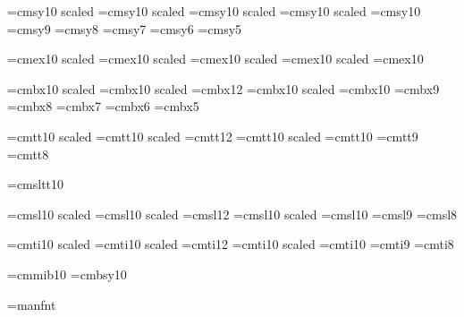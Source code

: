 \font\eighteensy=cmsy10 scaled		%
\font\fourteensy=cmsy10 scaled		%
\font\twelvesy=cmsy10 scaled		%
\font\elevensy=cmsy10 scaled\magstephalf	%
\font\tensy=cmsy10
\font\ninesy=cmsy9
\font\eightsy=cmsy8
\font\sevensy=cmsy7
\font\sixsy=cmsy6
\font\fivesy=cmsy5

\font\eighteenex=cmex10 scaled		%
\font\fourteenex=cmex10 scaled		%
\font\twelveex=cmex10 scaled		%
\font\elevenex=cmex10 scaled\magstephalf	%
\font\tenex=cmex10


\font\eighteenbf=cmbx10 scaled		%
\font\fourteenbf=cmbx10 scaled		%
\font\twelvebf=cmbx12				%
\font\elevenbf=cmbx10 scaled\magstephalf	%
\font\tenbf=cmbx10
\font\ninebf=cmbx9
\font\eightbf=cmbx8
\font\sevenbf=cmbx7
\font\sixbf=cmbx6
\font\fivebf=cmbx5

\font\eighteentt=cmtt10 scaled		%
\font\fourteentt=cmtt10 scaled		%
\font\twelvett=cmtt12				%
\font\eleventt=cmtt10 scaled \magstephalf	%
\font\tentt=cmtt10
\font\ninett=cmtt9
\font\eighttt=cmtt8

\font\preloaded=cmsltt10 %

\font\eighteensl=cmsl10 scaled		%
\font\fourteensl=cmsl10 scaled		%
\font\twelvesl=cmsl12				%
\font\elevensl=cmsl10 scaled \magstephalf	%
\font\tensl=cmsl10
\font\ninesl=cmsl9
\font\eightsl=cmsl8

\font\eighteenit=cmti10 scaled		%
\font\fourteenit=cmti10 scaled		%
\font\twelveit=cmti12				%
\font\elevenit=cmti10 scaled \magstephalf	%
\font\tenit=cmti10
\font\nineit=cmti9
\font\eightit=cmti8


\font\preloaded=cmmib10 %
\font\preloaded=cmbsy10 %

\font\preloaded=manfnt %

